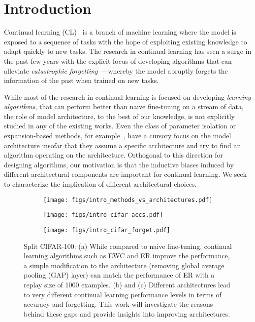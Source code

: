 \section{Introduction}\label{sec:intro}

Continual learning (CL)~\citep{ring1994continual,thrun1995lifelong} is a branch of machine learning where the model is exposed to a sequence of tasks with the hope of exploiting existing knowledge to adapt quickly to new tasks. The research in continual learning has seen a surge in the past few years with the explicit focus of developing algorithms that can alleviate \emph{catastrophic forgetting}~\citep{McCloskey1989CatastrophicII}---whereby the model abruptly forgets the information of the past when trained on new tasks.

While most of the research in continual learning is focused on developing \emph{learning algorithms}, that can perform better than naive fine-tuning on a stream of data, the role of model architecture, to the best of our knowledge, is not explicitly studied in any of the existing works. Even the class of parameter isolation or expansion-based methods, for example~\citep{rusu2016progressive,yoon2018lifelong}, have a cursory focus on the model architecture insofar that they assume a specific architecture and try to find an algorithm operating on the architecture. 
Orthogonal to this direction for designing algorithms, our motivation is that the inductive biases induced by different architectural components are important for continual learning. We seek to characterize the implication of different architectural choices.

\begin{figure*}[t]
\centering
\begin{subfigure}{.33\textwidth}
      \centering
      \texttt{[image: figs/intro\_methods\_vs\_architectures.pdf]}
      \caption{}
      \label{fig:intro-cifar-algs-vs-archs}
\end{subfigure}\hfill
\begin{subfigure}{.33\textwidth}
      \centering
      \texttt{[image: figs/intro\_cifar\_accs.pdf]}
      \caption{}
      \label{fig:intro-cifar-accs}
\end{subfigure}\hfill
\begin{subfigure}{.33\textwidth}
      \centering
      \texttt{[image: figs/intro\_cifar\_forget.pdf]}
      \caption{}
      \label{fig:intro-cifar-forgets}
\end{subfigure}
\vspace{-2mm}
\caption{Split CIFAR-100: (a) While compared to naive fine-tuning, continual learning algorithms such as EWC and ER improve the performance, a simple modification to the architecture (removing global average pooling (GAP) layer) can match the performance of ER with a replay size of 1000 examples. (b) and (c) Different architectures lead to very different continual learning performance levels in terms of accuracy and forgetting. This work will investigate the reasons behind these gaps and provide insights into improving architectures.}
\label{fig:intro-cifar}
\end{figure*}

